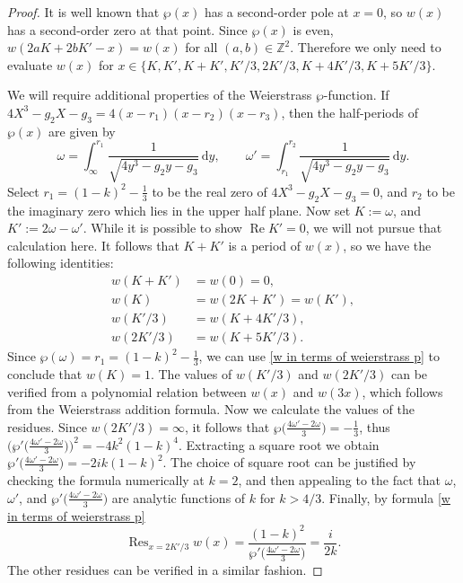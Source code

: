 \documentclass[12pt,reqno]{amsart}
\theoremstyle{remark}
\begin{document}
\begin{proof}
It is well known that $\wp(x)$ has a second-order pole at $x=0$,
so $w(x)$ has a second-order zero at that point. Since $\wp(x)$ is
even, $w(2a K+2b K'-x)=w(x)$ for all $(a,b)\in\mathbb{Z}^2$.
Therefore we only need to evaluate $w(x)$ for $x\in\{K, K', K+K',
K'/3,2K'/3, K+4K'/3, K+5K'/3\}$.

We will require additional properties of the Weierstrass
$\wp$-function.  If $4X^3-g_2 X-g_3=4(x-r_1)(x-r_2)(x-r_3)$, then
the half-periods of $\wp(x)$ are given by
\begin{equation*}
\omega=\int_{\infty}^{r_1}\frac{1}{\sqrt{4y^3-g_2 y-g_3}}\,{{\mathrm d}} y,
\qquad
\omega'=\int_{r_1}^{r_2}\frac{1}{\sqrt{4y^3-g_2 y-g_3}}\,{{\mathrm d}} y.
\end{equation*}
Select $r_1=(1-k)^2-\frac{1}{3}$ to be the real zero of $4X^3-g_2
X-g_3=0$, and $r_2$ to be the imaginary zero which lies in the
upper half plane.  Now set $K:=\omega$, and $K':=2\omega-\omega'$.
While it is possible to show ${\operatorname{Re}} K'=0$, we will not pursue that
calculation here. It follows that $K+K'$ is a period of $w(x)$, so
we have the following identities:
\begin{align*}
w(K+K')&=w(0)=0,\\
w(K)&=w(2K+K')=w(K'),\\
w(K'/3)&=w(K+4K'/3),\\
w(2K'/3)&=w(K+5K'/3).
\end{align*}
Since $\wp(\omega)=r_1=(1-k)^2-\frac{1}{3}$, we can use \eqref{w in
terms of weierstrass p} to conclude that $w(K)=1$. The values of
$w(K'/3)$ and $w(2K'/3)$ can be verified from a polynomial relation
between $w(x)$ and $w(3x)$, which follows from the Weierstrass
addition formula. Now we calculate the values of the residues. Since
$w(2K'/3)=\infty$, it follows that
$\wp\bigl(\frac{4\omega'-2\omega}{3}\bigr)=-\frac13$, thus
$\bigl(\wp'\bigl(\frac{4\omega'-2\omega}{3}\bigr)\bigr)^2=-4k^2(1-k)^4$.
Extracting a square root we obtain
$\wp'\bigl(\frac{4\omega'-2\omega}{3}\bigr)=-2i k(1-k)^2$. The
choice of square root can be justified by checking the formula
numerically at $k=2$, and then appealing to the fact that $\omega$,
$\omega'$, and $\wp'\bigl(\frac{4\omega'-2\omega}{3}\bigr)$ are
analytic functions of $k$ for $k>4/3$. Finally, by formula \eqref{w
in terms of weierstrass p}
\begin{equation*}
{\operatorname{Res}}_{x=2K'/3}w(x)=\frac{(1-k)^2}{\wp'\bigl(\frac{4\omega'-2\omega}{3}\bigr)}=\frac{i}{2k}.
\end{equation*}
The other residues can be verified in a similar fashion.
\end{proof}
\end{document}
